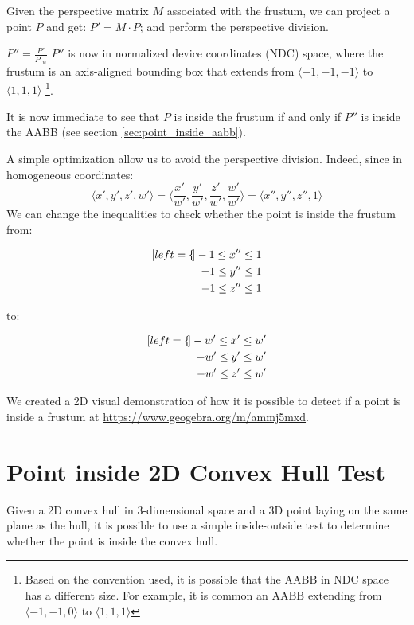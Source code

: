 \documentclass{PoliMi_MasterThesis}
\begin{document}
Given the perspective matrix $\textit{M}$ associated with the frustum, we can project a point $P$ and get: $P' = \textit{M} \cdot P$; and perform the perspective division. 

$P'' = \frac{P'}{P'_w}$ $P''$ is now in normalized device coordinates (NDC) space, where the frustum is an axis-aligned bounding box that extends from $\langle -1, -1, -1 \rangle$ to $\langle 1, 1, 1 \rangle$ \footnote{Based on the convention used, it is possible that the AABB in NDC space has a different size. For example, it is common an AABB extending from $\langle -1, -1, 0 \rangle$ to $\langle 1, 1, 1 \rangle$}.

It is now immediate to see that $P$ is inside the frustum if and only if $P''$ is inside the AABB (see section \ref{sec:point_inside_aabb}).

A simple optimization allow us to avoid the perspective division. Indeed, since in homogeneous coordinates:
$$\langle x',y',z',w' \rangle = \langle \frac{x'}{w'},\frac{y'}{w'},\frac{z'}{w'},\frac{w'}{w'} \rangle = \langle x'',y'',z'',1 \rangle$$
We can change the inequalities to check whether the point is inside the frustum from:

\begin{minipage}{.4\linewidth}
	\begin{subequations}
		\begin{align*}[left=\empheqlbrace]
			-1 \leq x'' \leq 1 \\
			-1 \leq y'' \leq 1 \\
			-1 \leq z'' \leq 1
		\end{align*}
	\end{subequations}
\end{minipage}
		to:
\begin{minipage}{.4\linewidth}
	\begin{subequations}
		\begin{align*}[left=\empheqlbrace]
			-w' \leq x' \leq w' \\
			-w' \leq y' \leq w' \\
			-w' \leq z' \leq w'
		\end{align*}
	\end{subequations}
\end{minipage}

We created a 2D visual demonstration of how it is possible to detect if a point is inside a frustum at \url{https://www.geogebra.org/m/ammj5mxd}.

\section{Point inside 2D Convex Hull Test} \label{sec:point_inside_2dHull}
Given a 2D convex hull in 3-dimensional space and a 3D point laying on the same plane as the hull, it is possible to use a simple inside-outside test \cite{ray_triangle_intersection} to determine whether the point is inside the convex hull.
\end{document}
